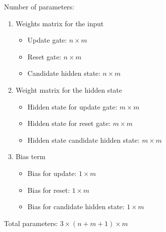 \documentclass[12pt,a4paper]{article}
\begin{document}
Number of parameters:\\
\begin{enumerate}
    \item Weights matrix for the input
    \begin{itemize}
        \item Update gate: $n \times m$
        \item Reset gate: $n \times m$
        \item Candidate hidden state: $n \times m$
    \end{itemize}

    \item Weight matrix for the hidden state
    \begin{itemize}
        \item Hidden state for update gate: $m \times m$
        \item Hidden state for reset gate: $m \times m$
        \item Hidden state candidate hidden state: $m \times m$
    \end{itemize}

    \item Bias term
    \begin{itemize}
        \item Bias for update: $1 \times m$
        \item Bias for reset: $1 \times m$
        \item Bias for candidate hidden state: $1 \times m$
    \end{itemize}
\end{enumerate}
Total parameters: $3 \times ( n + m + 1 ) \times m$


\end{document}
